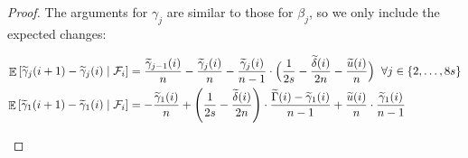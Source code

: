 \documentclass[a4paper,12pt]{article}
\DeclareMathOperator{\Ex}{\mathbb{E}}%
\begin{document}
\begin{proof}
The arguments for $\gamma_j$ are similar to those for $\beta_j$, so we only include the expected changes:
\begin{small}
\begin{align}
\Ex\left[\widetilde{\gamma}_j(i+1) - \widetilde{\gamma}_j(i) \mid \mathcal{F}_i \right] & = \frac{\widetilde{\gamma}_{j-1}(i)}{n} - \frac{\widetilde{\gamma}_j(i)}{n} - \frac{\widetilde{\gamma}_j(i)}{n-1} \cdot \Bigl( \frac{1}{2s} -  \frac{\widetilde{\delta}(i)}{2n} - \frac{\widetilde{u}(i)}{n}\Bigr) \; \; \forall j \in\{2, \ldots, 8s\} \notag \\
\Ex\left[\widetilde{\gamma}_1(i+1) - \widetilde{\gamma}_1(i) \mid \mathcal{F}_i \right] & = - \frac{\widetilde{\gamma}_1(i)}{n} + \left(\frac{1}{2s} - \frac{\widetilde{\delta}(i)}{2n} \right) \cdot  \frac{\widetilde{\Gamma}(i)-\widetilde{\gamma}_1(i)}{n-1} + \frac{\widetilde{u}(i)}{n} \cdot \frac{\widetilde{\gamma}_1(i)}{n-1} \notag
\end{align}
\end{small}
\end{proof}
\end{document}
